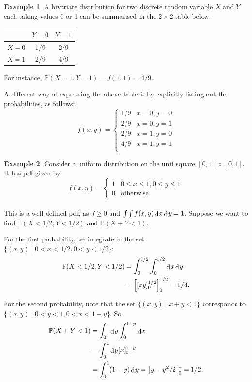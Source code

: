 \documentclass[
]{book}
\newcommand{\bbP}{\mathbb{P}}
\DeclareMathOperator{\dd}{d}
\newcommand{\dint}{\dd\hspace{0.5pt}\!}
\theoremstyle{definition}
\theoremstyle{definition}
\newtheorem{example}{Example}[chapter]
\theoremstyle{definition}
\theoremstyle{definition}
\theoremstyle{remark}
\begin{document}
\begin{example}
A bivariate distribution for two discrete random variable \(X\) and \(Y\) each taking values 0 or 1 can be summarised in the \(2\times 2\) table below.

\begin{longtable}[]{@{}rcc@{}}
\toprule
& \(Y=0\) & \(Y=1\) \\
\midrule
\endhead
\(X=0\) & 1/9 & 2/9 \\
\(X=1\) & 2/9 & 4/9 \\
\bottomrule
\end{longtable}

For instance, \(\bbP(X=1,Y=1) = f(1,1) = 4/9\).

A different way of expressing the above table is by explicitly listing out the probabilities, as follows:
\[
f(x,y) = \begin{cases}
1/9 & x=0,y=0 \\
2/9 & x=0,y=1 \\
2/9 & x=1,y=0 \\
4/9 & x=1,y=1 \\
\end{cases}
\]
\end{example}

\begin{example}
\protect\hypertarget{exm:unitsquare}{}\label{exm:unitsquare}Consider a uniform distribution on the unit square \([0,1] \times [0,1]\). It has pdf given by
\[
f(x,y) = \begin{cases}
  1 &0\leq x \leq 1, 0\leq y \leq 1 \\
  0 &\text{otherwise}
\end{cases}
\]\\
This is a well-defined pdf, as \(f\geq 0\) and \(\int\int f(x,y)\dint x \dint y = 1\).
Suppose we want to find \(\bbP(X<1/2, Y<1/2)\) and \(\bbP(X + Y < 1)\).

For the first probability, we integrate in the set \(\{(x,y) \mid 0 < x <1/2,0< y<1/2\}\):
\begin{align*}
\bbP(X<1/2, Y<1/2) &= \int_0^{1/2} \int_0^{1/2} \dint x \dint y \\
&= \left[ \left[ xy \right]_{0}^{1/2} \right]_{0}^{1/2} = 1/4.
\end{align*}

For the second probability, note that the set \(\{(x,y) \mid x+y<1\}\) corresponds to \(\{(x,y) \mid 0<y<1, 0<x < 1-y\}\). So
\begin{align*}
  \bbP(X+Y<1) &= \int_0^{1} \dint y \int_0^{1-y}  \dint x \\
  &= \int_0^{1} \dint y [x]_0^{1-y} \\
  &= \int_0^{1} (1-y) \dint y = \big[y - y^2/2\big]_0^1 = 1/2.
\end{align*}
\end{example}
\end{document}
